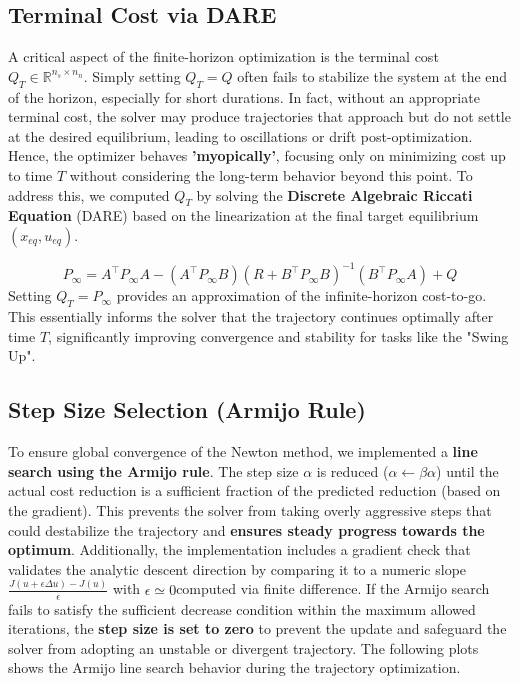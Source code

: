 \subsection{Terminal Cost via DARE}
A critical aspect of the finite-horizon optimization is the terminal cost $Q_T \in \mathbb{R}^{n_s \times n_n}$. Simply setting $Q_T = Q$ often fails to stabilize the system at the end of the horizon, especially for short durations.
In fact, without an appropriate terminal cost, the solver may produce trajectories that approach but do not settle at the desired equilibrium, leading to oscillations or drift post-optimization.
Hence, the optimizer behaves  \textbf{'myopically'}, focusing only on minimizing cost up to time $T$ without considering the long-term behavior beyond this point.
To address this, we computed $Q_T$ by solving the \textbf{Discrete Algebraic Riccati Equation} (DARE) based on the linearization at the final target equilibrium $(x_{eq}, u_{eq})$.

\begin{equation}
P_{\infty} = A^\top P_{\infty} A - (A^\top P_{\infty} B)(R + B^\top P_{\infty} B)^{-1} (B^\top P_{\infty} A) + Q
\end{equation}
Setting $Q_T = P_{\infty}$ provides an approximation of the infinite-horizon cost-to-go. This essentially informs the solver that the trajectory continues optimally after time $T$, significantly improving convergence and stability for tasks like the "Swing Up".

\subsection{Step Size Selection (Armijo Rule)}
To ensure global convergence of the Newton method, we implemented a \textbf{line search using the Armijo rule}. The step size $\alpha$ is reduced ($\alpha \leftarrow \beta \alpha$) until the actual cost reduction is a sufficient fraction of the predicted reduction (based on the gradient). 
This prevents the solver from taking overly aggressive steps that could destabilize the trajectory and \textbf{ensures steady progress towards the optimum}.
Additionally, the implementation includes a gradient check that validates the analytic descent direction by comparing it to a numeric slope $\frac{J(u + \epsilon \Delta u) - J(u)}{\epsilon}$ with $\epsilon \simeq 0$computed via finite difference. 
If the Armijo search fails to satisfy the sufficient decrease condition within the maximum allowed iterations, the \textbf{step size is set to zero} to prevent the update and safeguard the solver from adopting an unstable or divergent trajectory.
The following plots shows the Armijo line search behavior during the trajectory optimization.

